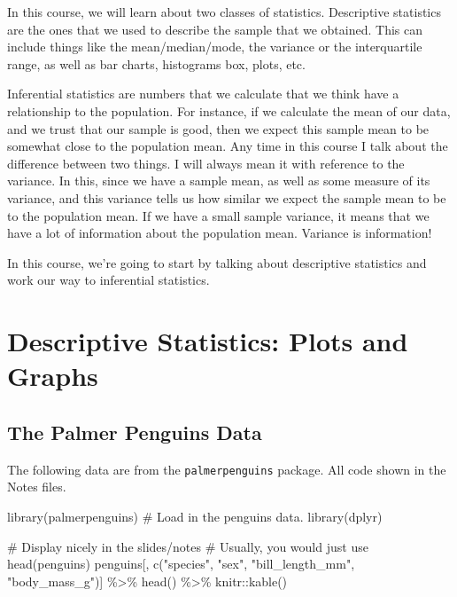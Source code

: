 \documentclass[
  letterpaper,
  DIV=11,
  numbers=noendperiod]{scrreprt}
\newenvironment{Shaded}{\begin{snugshade}}{\end{snugshade}}
\newcommand{\CommentTok}[1]{\textcolor[rgb]{0.37,0.37,0.37}{#1}}
\newcommand{\FunctionTok}[1]{\textcolor[rgb]{0.28,0.35,0.67}{#1}}
\newcommand{\NormalTok}[1]{\textcolor[rgb]{0.00,0.23,0.31}{#1}}
\newcommand{\SpecialCharTok}[1]{\textcolor[rgb]{0.37,0.37,0.37}{#1}}
\newcommand{\StringTok}[1]{\textcolor[rgb]{0.13,0.47,0.30}{#1}}
\begin{document}
In this course, we will learn about two classes of statistics.
Descriptive statistics are the ones that we used to describe the sample
that we obtained. This can include things like the mean/median/mode, the
variance or the interquartile range, as well as bar charts, histograms
box, plots, etc.

Inferential statistics are numbers that we calculate that we think have
a relationship to the population. For instance, if we calculate the mean
of our data, and we trust that our sample is good, then we expect this
sample mean to be somewhat close to the population mean. Any time in
this course I talk about the difference between two things. I will
always mean it with reference to the variance. In this, since we have a
sample mean, as well as some measure of its variance, and this variance
tells us how similar we expect the sample mean to be to the population
mean. If we have a small sample variance, it means that we have a lot of
information about the population mean. Variance is information!

In this course, we're going to start by talking about descriptive
statistics and work our way to inferential statistics.

\hypertarget{descriptive-statistics-plots-and-graphs}{%
\chapter{Descriptive Statistics: Plots and
Graphs}\label{descriptive-statistics-plots-and-graphs}}

\hypertarget{the-palmer-penguins-data}{%
\section{The Palmer Penguins Data}\label{the-palmer-penguins-data}}

The following data are from the \texttt{palmerpenguins} package. All
code shown in the Notes files.

\begin{Shaded}
\begin{Highlighting}[]
\FunctionTok{library}\NormalTok{(palmerpenguins) }\CommentTok{\# Load in the \textasciigrave{}penguins\textasciigrave{} data.}
\FunctionTok{library}\NormalTok{(dplyr)}

\CommentTok{\# Display nicely in the slides/notes}
\CommentTok{\# Usually, you would just use head(penguins)}
\NormalTok{penguins[, }\FunctionTok{c}\NormalTok{(}\StringTok{"species"}\NormalTok{, }\StringTok{"sex"}\NormalTok{, }\StringTok{"bill\_length\_mm"}\NormalTok{, }\StringTok{"body\_mass\_g"}\NormalTok{)] }\SpecialCharTok{\%\textgreater{}\%}
    \FunctionTok{head}\NormalTok{() }\SpecialCharTok{\%\textgreater{}\%}
\NormalTok{    knitr}\SpecialCharTok{::}\FunctionTok{kable}\NormalTok{()}
\end{Highlighting}
\end{Shaded}
\end{document}
